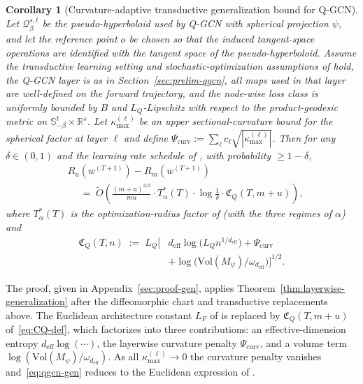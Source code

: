 \documentclass[letterpaper]{article}
\newcommand{\R}{\mathbb{R}}
\newtheorem{corollary}[theorem]{Corollary}
\begin{document}
\begin{corollary}[Curvature-adaptive transductive generalization bound for Q-GCN]
\label{thm:prgcn_transductive_generalization}
Let $\mathcal Q_\beta^{s,t}$ be the pseudo-hyperboloid used by Q-GCN with
spherical projection $\psi$, and let the reference point $o$ be chosen so
that the induced tangent-space operations are identified with the tangent
space of the pseudo-hyperboloid. Assume the transductive learning setting
and stochastic-optimization assumptions of
\cite[Theorem~4.3]{tang2023towards} hold, the Q-GCN layer is as in
Section~\ref{sec:prelim-qgcn}, all maps used in that layer are
well-defined on the forward trajectory, and the node-wise loss class is
uniformly bounded by $B$ and $L_Q$-Lipschitz with respect to the
product-geodesic metric on $\mathbb S^t_{-\beta} \times \R^s$. Let
$\kappa_{\max}^{(\ell)}$ be an upper sectional-curvature bound for the
spherical factor at layer $\ell$ and define
$\Psi_{\mathrm{curv}} := \sum_\ell c_\ell \sqrt{|\kappa_{\max}^{(\ell)}|}$.
Then for any $\delta \in (0,1)$ and the learning rate schedule of
\cite[Theorem~4.3]{tang2023towards}, with probability $\geq 1 - \delta$,
\begin{equation}
\label{eq:qgcn-gen}
\begin{aligned}
& R_u(w^{(T+1)}) - R_m(w^{(T+1)})\\
& \quad\;=\; \widetilde O\!\left(
\tfrac{(m+u)^{3/2}}{mu} \cdot T^*_\alpha(T) \cdot \log\tfrac1\delta \cdot
\mathfrak C_Q(T, m+u) \right),
\end{aligned}
\end{equation}
where $T^*_\alpha(T)$ is the optimization-radius factor of
\cite{tang2023towards} (with the three regimes of $\alpha$) and
\begin{equation}
\label{eq:CQ-def}
\begin{aligned}
\mathfrak C_Q(T, n) \;:=\; L_Q
\Big[ & d_{\mathrm{eff}} \log\!\big(L_Q n^{1/d_{\mathrm{eff}}}\big)
+ \Psi_{\mathrm{curv}}\\
& + \log\!\big(\mathrm{Vol}(M_\psi)/\omega_{d_{\mathrm{eff}}}\big)\Big]^{1/2}.
\end{aligned}
\end{equation}
\end{corollary}

The proof, given in Appendix~\ref{sec:proof-gen}, applies
Theorem~\ref{thm:layerwise-generalization} after the diffeomorphic chart
and transductive replacements above. The Euclidean architecture constant
$L_F$ of \cite{tang2023towards} is replaced by
$\mathfrak C_Q(T, m+u)$ of~\eqref{eq:CQ-def}, which factorizes into three
contributions: an effective-dimension entropy
$d_{\mathrm{eff}} \log(\cdots)$, the layerwise curvature penalty
$\Psi_{\mathrm{curv}}$, and a volume term
$\log(\mathrm{Vol}(M_\psi)/\omega_{d_{\mathrm{eff}}})$. As all
$\kappa_{\max}^{(\ell)} \to 0$ the curvature penalty vanishes
and~\eqref{eq:qgcn-gen} reduces to the Euclidean expression of
\cite{tang2023towards}.
\end{document}
